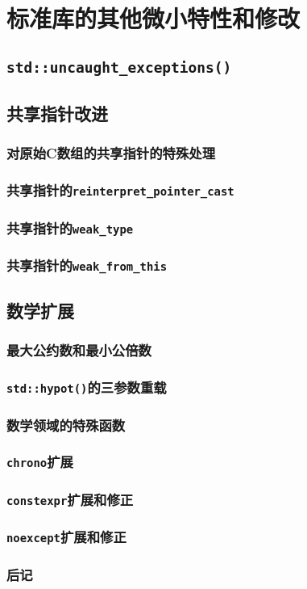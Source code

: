 \chapter{标准库的其他微小特性和修改}\label{ch28}

\section{\texttt{std::uncaught\_exceptions()}}

\section{共享指针改进}

\subsection{对原始C数组的共享指针的特殊处理}\label{ch28.2.1}

\subsection{共享指针的\texttt{reinterpret\_pointer\_cast}}

\subsection{共享指针的\texttt{weak\_type}}

\subsection{共享指针的\texttt{weak\_from\_this}}

\section{数学扩展}

\subsection{最大公约数和最小公倍数}

\subsection{\texttt{std::hypot()}的三参数重载}

\subsection{数学领域的特殊函数}

\subsection{\texttt{chrono}扩展}

\subsection{\texttt{constexpr}扩展和修正}\label{ch28.5}

\subsection{\texttt{noexcept}扩展和修正}

\subsection{后记}